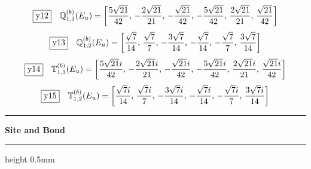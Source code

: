 \documentclass[fleqn,10pt,landscape]{jsarticle}
\begin{document}
\begin{dmath*}
\fbox{y12}\quad \mathbb{Q}_{1,1}^{(b)}(E_{u})=\left[ \frac{5 \sqrt{21}}{42},\, - \frac{2 \sqrt{21}}{21},\, - \frac{\sqrt{21}}{42},\, - \frac{5 \sqrt{21}}{42},\, \frac{2 \sqrt{21}}{21},\, \frac{\sqrt{21}}{42} \right]
\end{dmath*}
\begin{dmath*}
\fbox{y13}\quad \mathbb{Q}_{1,2}^{(b)}(E_{u})=\left[ \frac{\sqrt{7}}{14},\, \frac{\sqrt{7}}{7},\, - \frac{3 \sqrt{7}}{14},\, - \frac{\sqrt{7}}{14},\, - \frac{\sqrt{7}}{7},\, \frac{3 \sqrt{7}}{14} \right]
\end{dmath*}
\begin{dmath*}
\fbox{y14}\quad \mathbb{T}_{1,1}^{(b)}(E_{u})=\left[ \frac{5 \sqrt{21} i}{42},\, - \frac{2 \sqrt{21} i}{21},\, - \frac{\sqrt{21} i}{42},\, - \frac{5 \sqrt{21} i}{42},\, \frac{2 \sqrt{21} i}{21},\, \frac{\sqrt{21} i}{42} \right]
\end{dmath*}
\begin{dmath*}
\fbox{y15}\quad \mathbb{T}_{1,2}^{(b)}(E_{u})=\left[ \frac{\sqrt{7} i}{14},\, \frac{\sqrt{7} i}{7},\, - \frac{3 \sqrt{7} i}{14},\, - \frac{\sqrt{7} i}{14},\, - \frac{\sqrt{7} i}{7},\, \frac{3 \sqrt{7} i}{14} \right]
\end{dmath*}
\vspace{5mm}
\noindent \rule[0.5mm]{5mm}{0.5mm}\hspace{3mm}\textbf{Site and Bond}\hspace{3mm}\leaders\hrule height 0.5mm\hfill\kern0pt
\vspace{3mm}
\end{document}
